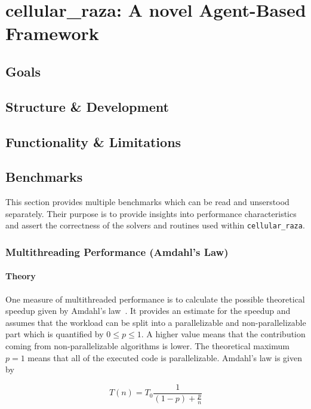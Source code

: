 \documentclass[a4paper]{article}
\begin{document}
\section{cellular\_raza: A novel Agent-Based Framework}
\cite{Pleyer2025}
\subsection{Goals}
\subsection{Structure \& Development}
\subsection{Functionality \& Limitations}

\subsection{Benchmarks}
This section provides multiple benchmarks which can be read and unserstood separately.
Their purpose is to provide insights into performance characteristics and assert the correctness of
the solvers and routines used within \texttt{cellular\_raza}.

\subsubsection{Multithreading Performance (Amdahl's Law)}

\paragraph{Theory}
One measure of multithreaded performance is to calculate the possible theoretical speedup
given by Amdahl's law~\cite{Rodgers1985}.
It provides an estimate for the speedup and assumes that the workload can be split into a
parallelizable and non-parallelizable part which is quantified by $0\leq p \leq1$.
A higher value means that the contribution coming from non-parallelizable algorithms is lower.
The theoretical maximum $p=1$ means that all of the executed code is parallelizable.
Amdahl's law is given by

\begin{equation}
    T(n) = T_0\frac{1}{(1-p) + \frac{p}{n}}
    \label{eq:amdahls-law}
\end{equation}
\end{document}
